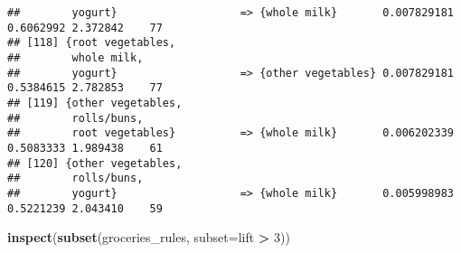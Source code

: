 \documentclass[]{article}
\newenvironment{Shaded}{\begin{snugshade}}{\end{snugshade}}
\newcommand{\KeywordTok}[1]{\textcolor[rgb]{0.13,0.29,0.53}{\textbf{#1}}}
\newcommand{\DataTypeTok}[1]{\textcolor[rgb]{0.13,0.29,0.53}{#1}}
\newcommand{\DecValTok}[1]{\textcolor[rgb]{0.00,0.00,0.81}{#1}}
\newcommand{\StringTok}[1]{\textcolor[rgb]{0.31,0.60,0.02}{#1}}
\newcommand{\OperatorTok}[1]{\textcolor[rgb]{0.81,0.36,0.00}{\textbf{#1}}}
\newcommand{\NormalTok}[1]{#1}
\begin{document}
\begin{verbatim}
##        yogurt}                   => {whole milk}       0.007829181  0.6062992 2.372842    77
## [118] {root vegetables,                                                                     
##        whole milk,                                                                          
##        yogurt}                   => {other vegetables} 0.007829181  0.5384615 2.782853    77
## [119] {other vegetables,                                                                    
##        rolls/buns,                                                                          
##        root vegetables}          => {whole milk}       0.006202339  0.5083333 1.989438    61
## [120] {other vegetables,                                                                    
##        rolls/buns,                                                                          
##        yogurt}                   => {whole milk}       0.005998983  0.5221239 2.043410    59
\end{verbatim}

\begin{Shaded}
\begin{Highlighting}[]
\KeywordTok{inspect}\NormalTok{(}\KeywordTok{subset}\NormalTok{(groceries_rules, }\DataTypeTok{subset=}\NormalTok{lift }\OperatorTok{>}\StringTok{ }\DecValTok{3}\NormalTok{))}
\end{Highlighting}
\end{Shaded}
\end{document}
